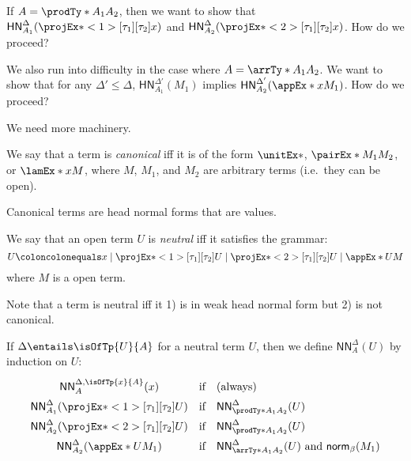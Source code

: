 \documentclass[letterpaper]{article}
\newcommand{\De}[0]{\Delta}
\newcommand{\betaNorm}[1]{\mathsf{norm}_\beta(#1)}
\newcommand{\HN}[3]{\mathsf{HN}^{#1}_{#2}(#3)}
\newcommand{\NN}[3]{\mathsf{NN}^{#1}_{#2}(#3)}
\begin{document}
If $A = \prodTy*{A_1}{A_2}$, then we want to show that
$\HN{\De}{A_1}{\fstEx*{x}}$ and $\HN{\De}{A_2}{\sndEx*{x}}$. How do we
proceed?

We also run into difficulty in the case where $A = \arrTy*{A_1}{A_2}$. We want
to show that for any $\De' \leq \De$, $\HN{\De'}{A_1}{M_1}$ implies
$\HN{\De'}{A_2}{\appEx*{x}{M_1}}$. How do we proceed?

We need more machinery.

\begin{definition}
We say that a term is \emph{canonical} iff it is of the form $\unitEx*$,
$\pairEx*{M_1}{M_2}$, or $\lamEx*{x}{M}$, where $M$, $M_1$, and $M_2$ are
arbitrary terms (i.e.\ they can be open).
\end{definition}

Canonical terms are head normal forms that are values.

\begin{definition}
We say that an open term $U$ is \emph{neutral} iff it satisfies the grammar:
\[
U \coloncolonequals x \mid \fstEx*{U} \mid \sndEx*{U} \mid \appEx*{U}{M}
\]
where $M$ is a open term.
\end{definition}

Note that a term is neutral iff it 1) is in weak head normal form but 2) is not
canonical.

\begin{definition}
If $\De \entails \isOfTp{U}{A}$ for a neutral term $U$, then we define
$\NN{\De}{A}{U}$ by induction on $U$:
\[
\renewcommand{\arraystretch}{1.5}
\begin{array}{cll}
  \NN{\De, \isOfTp{x}{A}}{A}{x} & \textrm{if} &
    \textrm{(always)} \\
  \NN{\De}{A_1}{\fstEx*{U}} & \textrm{if} &
    \NN{\De}{\prodTy*{A_1}{A_2}}{U} \\
  \NN{\De}{A_2}{\sndEx*{U}} & \textrm{if} &
    \NN{\De}{\prodTy*{A_1}{A_2}}{U} \\
  \NN{\De}{A_2}{\appEx*{U}{M_1}} & \textrm{if} &
    \NN{\De}{\arrTy*{A_1}{A_2}}{U} \textrm{ and } \betaNorm{M_1}
\end{array}
\]
\end{definition}
\end{document}
